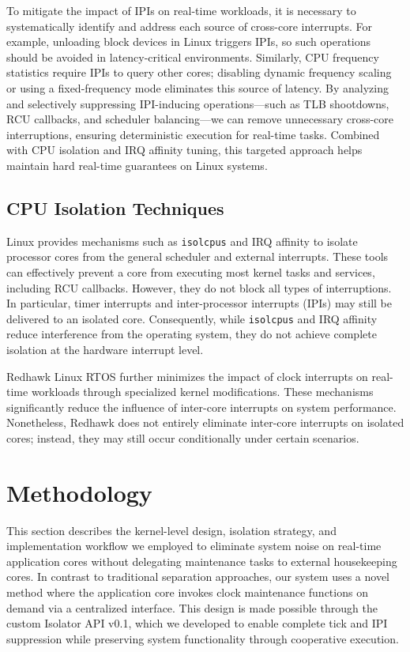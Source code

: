 \documentclass[letterpaper]{article}
\begin{document}
To mitigate the impact of IPIs on real-time workloads, it is necessary to systematically identify and 
address each source of cross-core interrupts. For example, unloading block devices in Linux triggers 
IPIs, so such operations should be avoided in latency-critical environments. Similarly, CPU frequency 
statistics require IPIs to query other cores; disabling dynamic frequency scaling or using a fixed-frequency 
mode eliminates this source of latency. By analyzing and selectively suppressing IPI-inducing operations—such as 
TLB shootdowns, RCU callbacks, and scheduler balancing—we can remove unnecessary cross-core interruptions, 
ensuring deterministic execution for real-time tasks. Combined with CPU isolation and IRQ affinity tuning, 
this targeted approach helps maintain hard real-time guarantees on Linux systems.



\subsection{CPU Isolation Techniques}

Linux provides mechanisms such as \texttt{isolcpus} and IRQ affinity \cite{KernelDocParam} 
to isolate processor cores from the general scheduler and external interrupts. 
These tools can effectively prevent a core from executing most kernel tasks and services, 
including RCU callbacks. However, they do not block all types of interruptions. 
In particular, timer interrupts and inter-processor interrupts (IPIs) may still be delivered 
to an isolated core. Consequently, while \texttt{isolcpus} and IRQ affinity reduce interference 
from the operating system, they do not achieve complete isolation at the hardware interrupt level.  

Redhawk Linux RTOS \cite{redhawk} further minimizes the impact of clock interrupts on real-time workloads 
through specialized kernel modifications. These mechanisms significantly reduce the influence 
of inter-core interrupts on system performance. Nonetheless, Redhawk does not entirely eliminate 
inter-core interrupts on isolated cores; instead, they may still occur conditionally under certain scenarios.


\section{Methodology}\label{BE}

This section describes the kernel-level design, isolation strategy, and implementation workflow we employed
to eliminate system noise on real-time application cores without delegating maintenance tasks to external
housekeeping cores. In contrast to traditional separation approaches, our system uses a novel method
where the application core invokes clock maintenance functions on demand via a centralized interface.
This design is made possible through the custom Isolator API v0.1, which we developed to enable complete
tick and IPI suppression while preserving system functionality through cooperative execution.
\end{document}
